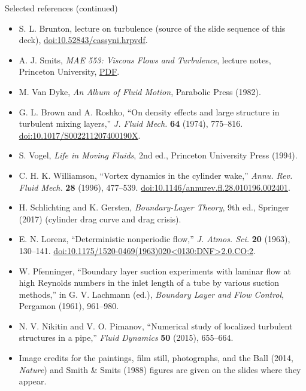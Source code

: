 \documentclass[aspectratio=169,11pt]{beamer}
\begin{document}
\begin{frame}{Selected references (continued)}
\scriptsize
\begin{itemize}
  \item S. L. Brunton, lecture on turbulence (source of the slide sequence of this deck), \href{https://doi.org/10.52843/cassyni.hrpvdf}{doi:10.52843/cassyni.hrpvdf}.
  \item A. J. Smits, \emph{MAE 553: Viscous Flows and Turbulence}, lecture notes, Princeton University, \href{http://profs.sci.univr.it/~zuccher/downloads/FD-MAE553-Smits.pdf}{PDF}.
  \item M. Van Dyke, \emph{An Album of Fluid Motion}, Parabolic Press (1982).
  \item G. L. Brown and A. Roshko, ``On density effects and large structure in turbulent mixing layers,'' \emph{J. Fluid Mech.} \textbf{64} (1974), 775--816. \href{https://doi.org/10.1017/S002211207400190X}{doi:10.1017/S002211207400190X}.
  \item S. Vogel, \emph{Life in Moving Fluids}, 2nd ed., Princeton University Press (1994).
  \item C. H. K. Williamson, ``Vortex dynamics in the cylinder wake,'' \emph{Annu. Rev. Fluid Mech.} \textbf{28} (1996), 477--539. \href{https://doi.org/10.1146/annurev.fl.28.010196.002401}{doi:10.1146/annurev.fl.28.010196.002401}.
  \item H. Schlichting and K. Gersten, \emph{Boundary-Layer Theory}, 9th ed., Springer (2017) (cylinder drag curve and drag crisis).
  \item E. N. Lorenz, ``Deterministic nonperiodic flow,'' \emph{J. Atmos. Sci.} \textbf{20} (1963), 130--141. \href{https://doi.org/10.1175/1520-0469(1963)020\%3C0130:DNF\%3E2.0.CO;2}{doi:10.1175/1520-0469(1963)020<0130:DNF>2.0.CO;2}.
  \item W. Pfenninger, ``Boundary layer suction experiments with laminar flow at high Reynolds numbers in the inlet length of a tube by various suction methods,'' in G. V. Lachmann (ed.), \emph{Boundary Layer and Flow Control}, Pergamon (1961), 961--980.
  \item N. V. Nikitin and V. O. Pimanov, ``Numerical study of localized turbulent structures in a pipe,'' \emph{Fluid Dynamics} \textbf{50} (2015), 655--664.
  \item Image credits for the paintings, film still, photographs, and the Ball (2014, \emph{Nature}) and Smith \& Smits (1988) figures are given on the slides where they appear.
\end{itemize}
\end{frame}
\end{document}
